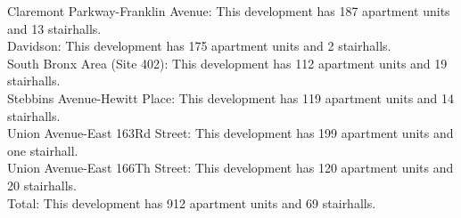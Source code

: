 {Claremont Parkway-Franklin Avenue}: This development has 187 apartment units and 13 stairhalls.\\{Davidson}: This development has 175 apartment units and 2 stairhalls.\\{South Bronx Area (Site 402)}: This development has 112 apartment units and 19 stairhalls.\\{Stebbins Avenue-Hewitt Place}: This development has 119 apartment units and 14 stairhalls.\\{Union Avenue-East 163Rd Street}: This development has 199 apartment units and one stairhall.\\{Union Avenue-East 166Th Street}: This development has 120 apartment units and 20 stairhalls.\\{Total}: This development has 912 apartment units and 69 stairhalls.\\